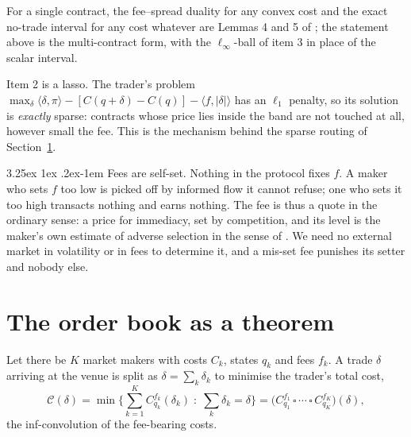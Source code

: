 \documentclass[11pt]{article}
\makeatletter
\renewcommand\paragraph{\@startsection{paragraph}{4}{\z@}%
  {3.25ex \@plus1ex \@minus.2ex}{-1em}%
  {\normalfont\normalsize\itshape}}
\theoremstyle{definition}
\theoremstyle{remark}
\newcommand{\ip}[2]{\langle #1,#2\rangle}
\makeatother
\begin{document}
For a single contract, the fee--spread duality for any convex cost and the exact no-trade interval for any cost
whatever are Lemmas 4 and 5 of \citet{cotton2026nonconvex}; the statement above is the multi-contract form, with
the $\ell_\infty$-ball of item 3 in place of the scalar interval.

Item 2 is a lasso. The trader's problem $\max_\delta\ip{\delta}{\pi}-[C(q+\delta)-C(q)]-\ip{f}{|\delta|}$ has an
$\ell_1$ penalty, so its solution is \emph{exactly} sparse: contracts whose price lies inside the band are not
touched at all, however small the fee. This is the mechanism behind the sparse routing of
Section~\ref{sec:aggregation}.

\paragraph{Fees are self-set.} Nothing in the protocol fixes $f$. A maker who sets $f$ too low is picked off by
informed flow it cannot refuse; one who sets it too high transacts nothing and earns nothing. The fee is thus a
quote in the ordinary sense: a price for immediacy, set by competition, and its level is the maker's own estimate
of adverse selection in the sense of \citet{glosten1985}. We need no external market in volatility or in fees to
determine it, and a mis-set fee punishes its setter and nobody else.

\section{The order book as a theorem}\label{sec:aggregation}

Let there be $K$ market makers with costs $C_k$, states $q_k$ and fees $f_k$. A trade $\delta$ arriving at the
venue is split as $\delta=\sum_k\delta_k$ to minimise the trader's total cost,
\begin{equation}\label{eq:infconv}
\mathcal{C}(\delta)=\min\Big\{\sum_{k=1}^{K}C^{f_k}_{q_k}(\delta_k)\;:\;\sum_k\delta_k=\delta\Big\}
=\big(C^{f_1}_{q_1}\,\square\,\cdots\,\square\,C^{f_K}_{q_K}\big)(\delta),
\end{equation}
the inf-convolution of the fee-bearing costs.
\end{document}
